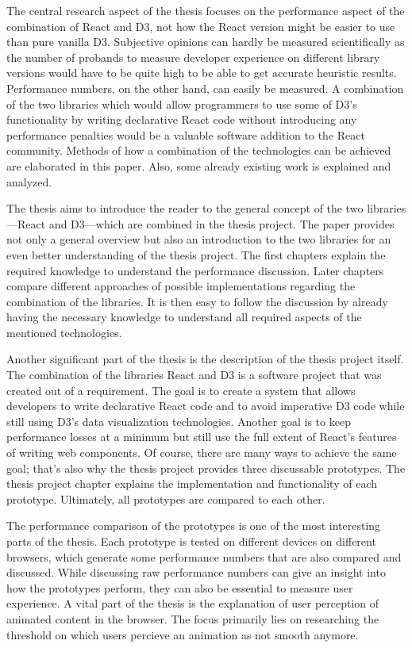 The central research aspect of the thesis focuses on the performance aspect of the combination of React and D3, not how the React version might be easier to use than pure vanilla D3. Subjective opinions can hardly be measured scientifically as the number of probands to measure developer experience on different library versions would have to be quite high to be able to get accurate heuristic results. Performance numbers, on the other hand, can easily be measured. A combination of the two libraries which would allow programmers to use some of D3's functionality by writing declarative React code without introducing any performance penalties would be a valuable software addition to the React community. Methods of how a combination of the technologies can be achieved are elaborated in this paper. Also, some already existing work is explained and analyzed.

The thesis aims to introduce the reader to the general concept of the two libraries---React and D3---which are combined in the thesis project. The paper provides not only a general overview but also an introduction to the two libraries for an even better understanding of the thesis project. The first chapters explain the required knowledge to understand the performance discussion. Later chapters compare different approaches of possible implementations regarding the combination of the libraries. It is then easy to follow the discussion by already having the necessary knowledge to understand all required aspects of the mentioned technologies.

Another significant part of the thesis is the description of the thesis project itself. The combination of the libraries React and D3 is a software project that was created out of a requirement. The goal is to create a system that allows developers to write declarative React code and to avoid imperative D3 code while still using D3's data visualization technologies. Another goal is to keep performance losses at a minimum but still use the full extent of React's features of writing web components. Of course, there are many ways to achieve the same goal; that's also why the thesis project provides three discussable prototypes. The thesis project chapter explains the implementation and functionality of each prototype. Ultimately, all prototypes are compared to each other.

The performance comparison of the prototypes is one of the most interesting parts of the thesis. Each prototype is tested on different devices on different browsers, which generate some performance numbers that are also compared and discussed. While discussing raw performance numbers can give an insight into how the prototypes perform, they can also be essential to measure user experience. A vital part of the thesis is the explanation of user perception of animated content in the browser. The focus primarily lies on researching the threshold on which users percieve an animation as not smooth anymore.

